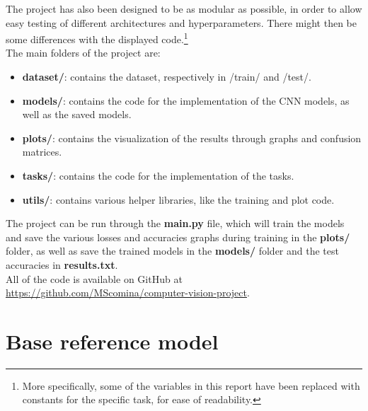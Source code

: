 \documentclass[a4paper, 11pt]{article}
\begin{document}
The project has also been designed to be as modular as possible, in order to allow easy testing
of different architectures and hyperparameters. There might then be some differences with the displayed 
code.\footnote{More specifically, some of the variables in this report have been replaced with constants for the specific task, for ease of readability.}\\
The main folders of the project are:
\begin{itemize}
    \item \textbf{dataset/}: contains the dataset, respectively in /train/ and /test/.
    \item \textbf{models/}: contains the code for the implementation of the CNN models, as well as the saved models.
    \item \textbf{plots/}: contains the visualization of the results through graphs and confusion matrices.
    \item \textbf{tasks/}: contains the code for the implementation of the tasks.
    \item \textbf{utils/}: contains various helper libraries, like the training and plot code.
\end{itemize}
The project can be run through the \textbf{main.py} file, which will train the models and
save the various losses and accuracies graphs during training in the \textbf{plots/} folder,
as well as save the trained models in the \textbf{models/} folder and the test accuracies in \textbf{results.txt}.\\
All of the code is available on GitHub at \url{https://github.com/MScomina/computer-vision-project}.

\pagebreak

\section{Base reference model}
\end{document}

